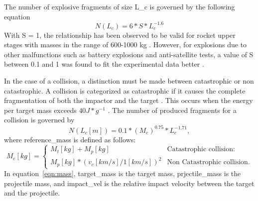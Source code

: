 \documentclass[a4paper, 12pt]{article}
\begin{document}
The number of explosive fragments of size \Gls{L_c} is governed by the following equation
\begin{equation}
	N(L_c) =6*S * L_c^{-1.6}
\end{equation}
With S = 1, the relationship has been observed to be valid for rocket upper stages with masses in the range of 600-1000 kg \citep{johnson_nasas_2001}. However, for explosions due to other malfunctions such as battery explosions and anti-satellite tests, a value of S between 0.1 and 1 was found to fit the experimental data better \citep{krisko_proper_2011}.

In the case of a collision, a distinction must be made between catastrophic or non catastrophic. A collision is categorized as catastrophic if it causes the complete fragmentation of both the impactor and the target \citep{letizia_space_2016}. This occurs when the energy per target mass exceeds $40 J * g^{-1}$ \citep{krisko_proper_2011}. The number of produced fragments for a collision is governed by
\begin{equation}
	N(L_c [m]) = 0.1 * (M_e)^{0.75} * L_c^{-1.71},
\end{equation}
where \Gls{reference_mass} is defined as follows: 
\begin{equation}
	M_e[kg] = \begin{cases}
		M_t [kg] + M_p[kg]& \text{Catastrophic collision: } \\
		 M_p[kg] * (v_c [km/s] / 1 [km/s])^2 & \text{Non Catastrophic collision}.	
	\end{cases}
	\label{eqn:mass}
\end{equation}
\noindent In equation~\ref{eqn:mass},  \Gls{target_mass} is the target mass, \Gls{prjectile_mass} is the projectile mass, and \Gls{impact_vel} is the relative impact velocity between the target and the projectile.
\end{document}
